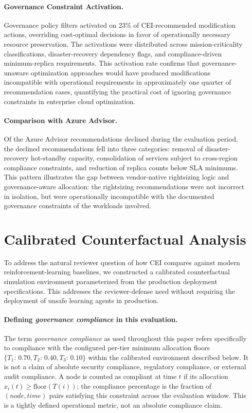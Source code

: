 \documentclass[runningheads]{llncs}
\begin{document}
\paragraph{Governance Constraint Activation.} Governance policy filters activated on 23\% of CEI-recommended modification actions, overriding cost-optimal decisions in favor of operationally necessary resource preservation. The activations were distributed across mission-criticality classifications, disaster-recovery dependency flags, and compliance-driven minimum-replica requirements. This activation rate confirms that governance-unaware optimization approaches would have produced modifications incompatible with operational requirements in approximately one quarter of recommendation cases, quantifying the practical cost of ignoring governance constraints in enterprise cloud optimization.

\paragraph{Comparison with Azure Advisor.} Of the Azure Advisor recommendations declined during the evaluation period, the declined recommendations fell into three categories: removal of disaster-recovery hot-standby capacity, consolidation of services subject to cross-region compliance constraints, and reduction of replica counts below SLA minimums. This pattern illustrates the gap between vendor-native rightsizing logic and governance-aware allocation: the rightsizing recommendations were not incorrect in isolation, but were operationally incompatible with the documented governance constraints of the workloads involved.

\section{Calibrated Counterfactual Analysis}
\label{sec:counterfactual}

To address the natural reviewer question of how CEI compares against modern reinforcement-learning baselines, we constructed a calibrated counterfactual simulation environment parameterized from the production deployment specifications. This addresses the reviewer-defense need without requiring the deployment of unsafe learning agents in production.

\paragraph{Defining \emph{governance compliance} in this evaluation.} The term \emph{governance compliance} as used throughout this paper refers specifically to compliance with the configured per-tier minimum allocation floors $\{T_1{:}\,0.70, T_2{:}\,0.40, T_3{:}\,0.10\}$ within the calibrated environment described below. It is not a claim of absolute security compliance, regulatory compliance, or external audit compliance. A node is counted as compliant at time $t$ if its allocation $x_i(t) \geq \text{floor}(T(i))$; the compliance percentage is the fraction of $(node, time)$ pairs satisfying this constraint across the evaluation window. This is a tightly defined operational metric, not an absolute compliance claim.
\end{document}
